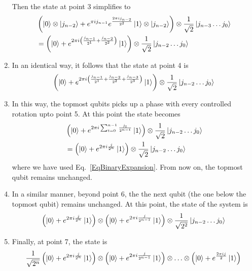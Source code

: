 \documentclass[12pt,oneside]{book}
\begin{document}
\begin{enumerate}
    Then the state at point 3 simplifies to
    \begin{align*}
       &{} \left(\ket{0}\otimes\ket{j_{n-2}}+e^{\pi i j_{n-1}}e^{\frac{2\pi i j_{n-2}}{2^2}}\ket{1}\otimes\ket{j_{n-2}}\right) \otimes \frac{1}{\sqrt{2}}\ket{j_{n-3}\hdots j_0}\\
       &{} = \left(\ket{0}+e^{2\pi i \left(\frac{j_{n-1}}{2^1}+\frac{j_{n-2}}{2^2}\right)}\ket{1}\right) \otimes \frac{1}{\sqrt{2}}\ket{j_{n-2}\hdots j_0}\\
    \end{align*}
    \item In an identical way, it follows that the state at point 4 is
    \begin{align*}
         \left(\ket{0}+e^{2\pi i \left(\frac{j_{n-1}}{2^1}+\frac{j_{n-2}}{2^2}+\frac{j_{n-3}}{2^3}\right)}\ket{1}\right) \otimes \frac{1}{\sqrt{2}}\ket{j_{n-2}\hdots j_0}
    \end{align*}
    \item In this way, the topmost qubits picks up a phase with every controlled rotation upto point 5. At this point the state becomes
    \begin{align*}
        &{}\left(\ket{0}+e^{2\pi i \sum_{t=0}^{n-1}\frac{j_t}{2^{n-t}}}\ket{1}\right) \otimes \frac{1}{\sqrt{2}}\ket{j_{n-2}\hdots j_0}\\
        &{}=\left(\ket{0}+e^{2\pi i\frac{j}{2^n}}\ket{1}\right) \otimes \frac{1}{\sqrt{2}}\ket{j_{n-2}\hdots j_0}
    \end{align*}
    where we have used Eq.~\ref{EqBinaryExpansion}.
    From now on, the topmost qubit remains unchanged.
    \item In a similar manner, beyond point 6, the the next qubit (the one below the topmost qubit) remains unchanged. At this point, the state of the system is
    \begin{align*}
        \left(\ket{0}+e^{2\pi i\frac{j}{2^n}}\ket{1}\right) \otimes \left(\ket{0}+e^{2\pi i\frac{j}{2^{n-1}}}\ket{1}\right) \otimes \frac{1}{\sqrt{2^2}}\ket{j_{n-2}\hdots j_0}
    \end{align*}
\item Finally, at point 7, the state is
\begin{align*}
    \frac{1}{\sqrt{2^n}} \left(\ket{0}+e^{2\pi i\frac{j}{2^n}}\ket{1}\right) \otimes \left(\ket{0}+e^{2\pi i\frac{j}{2^{n-1}}}\ket{1}\right) \otimes \hdots \otimes \left(\ket{0} + e^{\frac{2\pi ij}{2}}\ket{1}\right)
\end{align*}
\end{enumerate}
\end{document}
